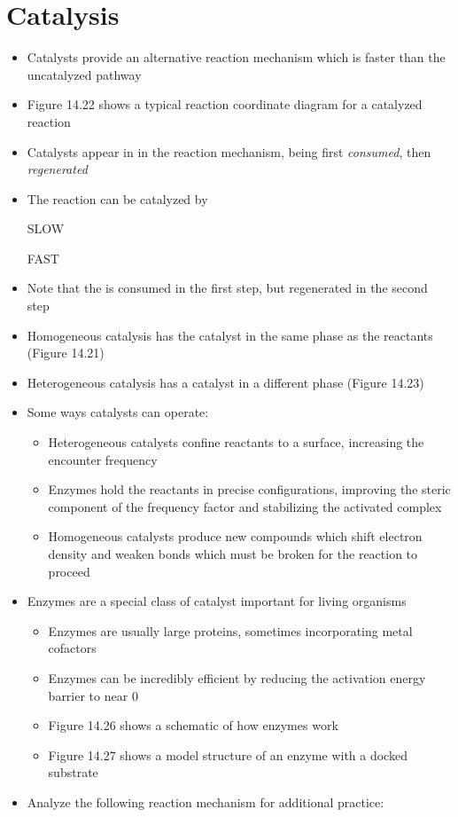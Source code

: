 \documentclass[12pt, openany, letterpaper]{memoir}
\begin{document}
\section{Catalysis}
\begin{itemize}
	\item Catalysts provide an alternative reaction mechanism which is faster than the uncatalyzed pathway
	\item Figure 14.22 shows a typical reaction coordinate diagram for a catalyzed reaction
	\item Catalysts appear in in the reaction mechanism, being first \emph{consumed}, then \emph{regenerated}
	\item The reaction  can be catalyzed by 
	
	 \hspace{1em} SLOW
	
	 \hspace{1em} FAST
	\item Note that the  is consumed in the first step, but regenerated in the second step
  \item Homogeneous catalysis has the catalyst in the same phase as the reactants (Figure 14.21)
  \item Heterogeneous catalysis has a catalyst in a different phase (Figure 14.23)
	\item Some ways catalysts can operate:
	\begin{itemize}
		\item Heterogeneous catalysts confine reactants to a surface, increasing the encounter frequency
		\item Enzymes hold the reactants in precise configurations, improving the steric component of the frequency factor and stabilizing the activated complex
		\item Homogeneous catalysts produce new compounds which shift electron density and weaken bonds which must be broken for the reaction to proceed
	\end{itemize}
  \item Enzymes are a special class of catalyst important for living organisms
  \begin{itemize}
    \item Enzymes are usually large proteins, sometimes incorporating metal cofactors
    \item Enzymes can be incredibly efficient by reducing the activation energy barrier to near $0$
    \item Figure 14.26 shows a schematic of how enzymes work
    \item Figure 14.27 shows a model structure of an enzyme with a docked substrate
  \end{itemize}
	\item Analyze the following reaction mechanism for additional practice:
	

\end{itemize}
\end{document}
